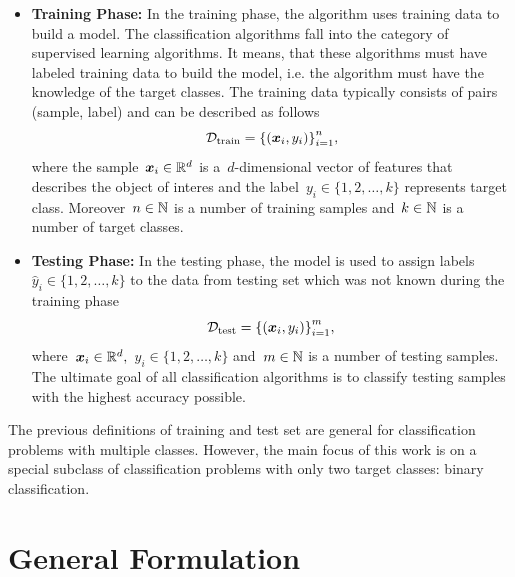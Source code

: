 \begin{itemize}
  \item \textbf{Training Phase:} In the training phase, the algorithm uses training data to build a model. The classification algorithms fall into the category of supervised learning algorithms. It means, that these algorithms must have labeled training data to build the model, i.e. the algorithm must have the knowledge of the target classes. The training data typically consists of pairs (sample, label) and can be described as follows
  \begin{equation*}\label{eq: training set}
    \mathcal{D}_{\mathrm{train}} = \Brac[c]{(\bm{x}_i, y_i)}_{i=1}^{n},
  \end{equation*}
  where the sample~$\bm{x}_i \in \mathbb{R}^d$ is a~$d$-dimensional vector of features that describes the object of interes and the label~$y_i \in \{1, 2, \ldots, k\}$ represents target class. Moreover~$n \in \mathbb{N}$ is a number of training samples and~$k \in \mathbb{N}$ is a number of target classes.
  \item \textbf{Testing Phase:} In the testing phase, the model is used to assign labels~$\hat{y}_i \in \{1, 2, \ldots, k\}$ to the data from testing set which was not known during the training phase
  \begin{equation*}\label{eq: test set}
    \mathcal{D}_{\mathrm{test}} = \Brac[c]{(\bm{x}_i, y_i)}_{i=1}^{m},
  \end{equation*}
  where~$\bm{x}_i \in \mathbb{R}^d,$~$y_i \in \{1, 2, \ldots, k\}$ and~$m \in \mathbb{N}$ is a number of testing samples. The ultimate goal of all classification algorithms is to classify testing samples with the highest accuracy possible.
\end{itemize}
The previous definitions of training and test set are general for classification problems with multiple classes. However, the main focus of this work is on a special subclass of classification problems with only two target classes: binary classification.


\section{General Formulation}

